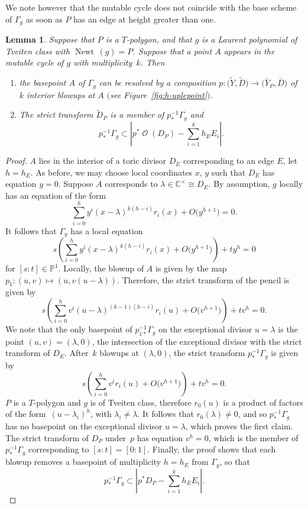 \documentclass[11pt]{article}
\numberwithin{equation}{section}
\newtheorem{Lemma}[Theorem]{Lemma}
\DeclareMathOperator{\Newt}{{Newt \,}}
\DeclareMathOperator{\cO}{\mathcal{O}}
\newcommand{\CC}{\mathbb{C}}
\newcommand{\PP}{\mathbb{P}}
\begin{document}
We note however that the mutable cycle does not coincide with the base scheme of $\Gamma_g$ as soon as $P$ has an edge at height greater than one.
\begin{Lemma}\label{lem:resolutionofsingularities}
Suppose that $P$ is a $T$-polygon, and that $g$ is a Laurent polynomial of Tveiten class with $\Newt(g)=P$. Suppose that a point $A$ appears in the mutable cycle of $g$ with multiplicity~$k$. Then
\begin{enumerate}\itemsep=0pt
	\item[$(1)$] the basepoint $A$ of $\Gamma_g$ can be resolved by a composition $p \colon \bigl(\tilde{Y}, \tilde{D}\bigr) \rightarrow \bigl(\bar{Y}_P, \bar{D}\bigr)$ of $k$ interior blowups at $A$ $($see Figure~{\rm\ref{fig:h-uplepoint}}$)$.
	\item[$(2)$] The strict transform $\tilde{D}_P$ is a member of $p_*^{-1}\Gamma_g$ and
	\[p_*^{-1}\Gamma_g \subset \left|p^*\cO(D_P)-\sum_{i=1}^{k} h_E E_i\right|.
	\]
\end{enumerate}
\end{Lemma}
\begin{proof}
$A$ lies in the interior of a toric divisor $D_E$ corresponding to an edge $E$, let $h=h_E$.
As before, we may choose local coordinates $x$, $y$ such that $D_E$ has equation $y=0$. Suppose $A$ corresponds to $\lambda \in \CC^\times \cong D_E$. By assumption, $g$ locally has an equation of the form
\[
\sum_{i=0}^h y^i(x-\lambda)^{k(h-i)}r_i(x)+O\bigl(y^{h+1}\bigr)=0.
\]
It follows that $\Gamma_g$ has a local equation
\[
s\left(\sum_{i=0}^h y^i(x-\lambda)^{k(h-i)}r_i(x)+O\bigl(y^{h+1}\bigr)\right)+ty^h=0
\]
for $[s:t]\in \PP^1$.
Locally, the blowup of $A$ is given by the map $p_1 \colon (u,v) \mapsto (u, v(u-\lambda))$. Therefore, the strict transform of the pencil is given by
 \[
s\left(\sum_{i=0}^h v^i(u-\lambda)^{(k-1)(h-i)}r_i(u)+O\bigl(v^{h+1}\bigr)\right)+tv^h=0.
 \]
We note that the only basepoint of $p_{1*}^{-1}\Gamma_g$ on the exceptional divisor $u=\lambda$ is the point ${(u,v)=(\lambda, 0)}$, the intersection of the exceptional divisor with the strict transform of $D_E$.
After~$k$ blowups at $(\lambda, 0)$, the strict transform $p_*^{-1}\Gamma_g$ is given by
 \[
 s\left(\sum_{i=0}^h v^ir_i(u)+O\bigl(v^{h+1}\bigr)\right)+tv^h=0.
 \]
 $P$ is a $T$-polygon and $g$ is of Tveiten class, therefore $r_0(u)$ is a product of factors of the form~${(u-\lambda_i)^h}$, with $\lambda_i \neq \lambda$. It follows that $r_0(\lambda) \neq 0$, and so $p_*^{-1}\Gamma_g$ has no basepoint on the exceptional divisor $u=\lambda$, which proves the first claim.
The strict transform of $D_P$ under~$p$ has equation $v^h=0$, which is the member of $p_{*}^{-1}\Gamma_g$ corresponding to $[s:t]=[0:1]$. Finally, the proof shows that each blowup removes a basepoint of multiplicity $h=h_E$ from $\Gamma_g$, so that%
	\[
	p_*^{-1}\Gamma_g \subset \left|p^*D_P-\sum_{i=1}^{k} h_E E_i\right|.\tag*{\qed}
\] \renewcommand{\qed}{}
\end{proof}
\end{document}
